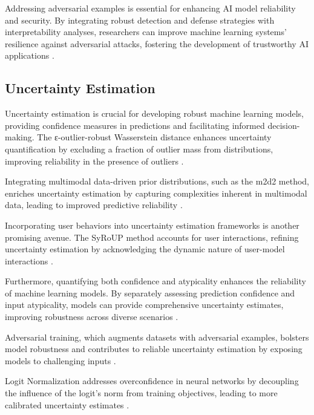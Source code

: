 Addressing adversarial examples is essential for enhancing AI model reliability and security. By integrating robust detection and defense strategies with interpretability analyses, researchers can improve machine learning systems' resilience against adversarial attacks, fostering the development of trustworthy AI applications \cite{anisetti2023rethinkingcertificationtrustworthymachine,liu2020adversarialattacksdefensesinterpretation}.

\subsection{Uncertainty Estimation} \label{subsec:Uncertainty Estimation}

Uncertainty estimation is crucial for developing robust machine learning models, providing confidence measures in predictions and facilitating informed decision-making. The ε-outlier-robust Wasserstein distance enhances uncertainty quantification by excluding a fraction of outlier mass from distributions, improving reliability in the presence of outliers \cite{nietert2023outlierrobustoptimaltransportduality}.

Integrating multimodal data-driven prior distributions, such as the m2d2 method, enriches uncertainty estimation by capturing complexities inherent in multimodal data, leading to improved predictive reliability \cite{lopez2023informativepriorsimprovereliability}.

Incorporating user behaviors into uncertainty estimation frameworks is another promising avenue. The SyRoUP method accounts for user interactions, refining uncertainty estimation by acknowledging the dynamic nature of user-model interactions \cite{sicilia2024accountingsycophancylanguagemodel}.

Furthermore, quantifying both confidence and atypicality enhances the reliability of machine learning models. By separately assessing prediction confidence and input atypicality, models can provide comprehensive uncertainty estimates, improving robustness across diverse scenarios \cite{yuksekgonul2023confidencereliablemodelsconsider}.

Adversarial training, which augments datasets with adversarial examples, bolsters model robustness and contributes to reliable uncertainty estimation by exposing models to challenging inputs \cite{debicha2021adversarialtrainingdeeplearningbased}.

Logit Normalization addresses overconfidence in neural networks by decoupling the influence of the logit's norm from training objectives, leading to more calibrated uncertainty estimates \cite{wei2022mitigatingneuralnetworkoverconfidence}.


